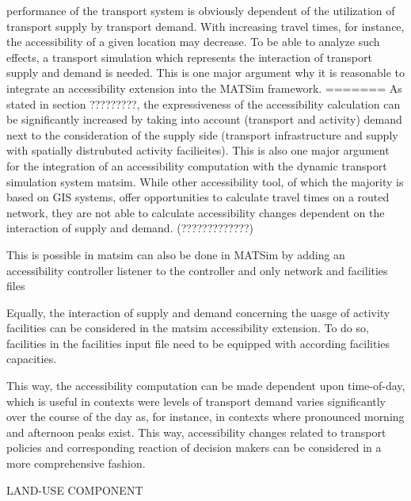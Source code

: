 performance of the transport system is obviously dependent of the utilization of transport supply by transport 
demand. With increasing travel times, for instance, the accessibility of a given location may decrease. To be able 
to analyze such effects, a transport simulation which represents the interaction of transport supply and demand is 
needed. This is one major argument why it is reasonable to integrate an accessibility extension into the MATSim framework.
=======
As stated in section ?????????, the expressiveness of the accessibility calculation can be significantly increased 
by taking into account (transport and activity) demand next to the consideration of the supply side (transport 
infrastructure and supply with spatially distrubuted activity facilieites). This is also one major argument for 
the integration of an accessibility computation with the dynamic transport simulation system \gls{matsim}. While 
other accessibility tool, of which the majority is based on GIS systems, offer opportunities to calculate travel 
times on a routed network, they are not able to calculate accessibility changes dependent on the interaction of 
supply and demand. (?????????????)

This is possible in \gls{matsim} can also be done in MATSim by adding an accessibility controller listener to the 
controller and only network and facilities files

Equally, the interaction of supply and demand concerning the uasge of activity facilities can be considered in 
the \gls{matsim} accessibility extension. To do so, facilities in the facilities input file need to be equipped 
with according facilities capacities.

This way, the accessibility computation can be made dependent upon time-of-day, which is useful in contexts were 
levels of transport demand varies significantly over the course of the day as, for instance, in contexts where 
pronounced morning and afternoon peaks exist. This way, accessibility changes related to transport policies and 
corresponding reaction of decision makers can be considered in a more comprehensive fashion.


LAND-USE COMPONENT

